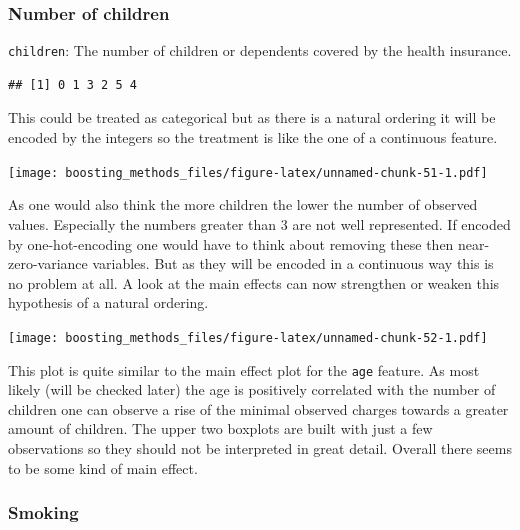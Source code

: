 \documentclass[
]{book}
\newenvironment{Shaded}{\begin{snugshade}}{\end{snugshade}}
\newcommand{\CommentTok}[1]{\textcolor[rgb]{0.56,0.35,0.01}{\textit{#1}}}
\newcommand{\FunctionTok}[1]{\textcolor[rgb]{0.00,0.00,0.00}{#1}}
\newcommand{\NormalTok}[1]{#1}
\newcommand{\SpecialCharTok}[1]{\textcolor[rgb]{0.00,0.00,0.00}{#1}}
\begin{document}
\hypertarget{number-of-children}{%
\subsubsection{Number of children}\label{number-of-children}}

\texttt{children}: The number of children or dependents covered by the health insurance.

\begin{Shaded}
\end{Shaded}

\begin{verbatim}
## [1] 0 1 3 2 5 4
\end{verbatim}

This could be treated as categorical but as there is a natural ordering it will be encoded by the integers so the treatment is like the one of a continuous feature.

\texttt{[image: boosting\_methods\_files/figure-latex/unnamed-chunk-51-1.pdf]}

As one would also think the more children the lower the number of observed values. Especially the numbers greater than 3 are not well represented. If encoded by one-hot-encoding one would have to think about removing these then near-zero-variance variables. But as they will be encoded in a continuous way this is no problem at all. A look at the main effects can now strengthen or weaken this hypothesis of a natural ordering.

\texttt{[image: boosting\_methods\_files/figure-latex/unnamed-chunk-52-1.pdf]}

This plot is quite similar to the main effect plot for the \texttt{age} feature. As most likely (will be checked later) the age is positively correlated with the number of children one can observe a rise of the minimal observed charges towards a greater amount of children. The upper two boxplots are built with just a few observations so they should not be interpreted in great detail. Overall there seems to be some kind of main effect.

\hypertarget{smoking}{%
\subsubsection{Smoking}\label{smoking}}
\end{document}
